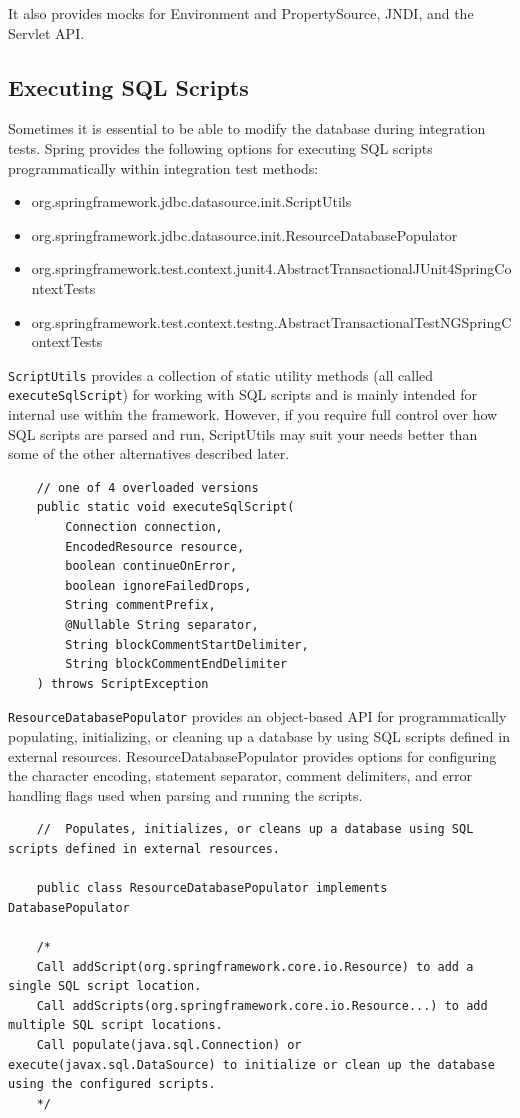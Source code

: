 \documentclass{scrartcl}
\begin{document}
It also provides mocks for Environment and PropertySource, JNDI, and the Servlet API.
\subsection{Executing SQL Scripts}

Sometimes it is essential to be able to modify the database during integration tests.
Spring provides the following options for executing SQL scripts programmatically within integration test methods:

\begin{itemize}
    \item org.springframework.jdbc.datasource.init.ScriptUtils
    \item org.springframework.jdbc.datasource.init.ResourceDatabasePopulator
    \item org.springframework.test.context.junit4.AbstractTransactionalJUnit4SpringContextTests
    \item org.springframework.test.context.testng.AbstractTransactionalTestNGSpringContextTests
\end{itemize}

\lstinline|ScriptUtils| provides a collection of static utility methods (all called \lstinline|executeSqlScript|) for working with SQL scripts and is mainly intended for internal use within the framework. However, if you require full control over how SQL scripts are parsed and run, ScriptUtils may suit your needs better than some of the other alternatives described later.

\begin{lstlisting}
    // one of 4 overloaded versions
    public static void executeSqlScript(
        Connection connection,
        EncodedResource resource,
        boolean continueOnError,
        boolean ignoreFailedDrops,
        String commentPrefix,
        @Nullable String separator,
        String blockCommentStartDelimiter,
        String blockCommentEndDelimiter
    ) throws ScriptException
\end{lstlisting}

\lstinline|ResourceDatabasePopulator| provides an object-based API for programmatically populating, initializing, or cleaning up a database by using SQL scripts defined in external resources. ResourceDatabasePopulator provides options for configuring the character encoding, statement separator, comment delimiters, and error handling flags used when parsing and running the scripts.

\begin{lstlisting}
    //  Populates, initializes, or cleans up a database using SQL scripts defined in external resources.

    public class ResourceDatabasePopulator implements DatabasePopulator

    /*
    Call addScript(org.springframework.core.io.Resource) to add a single SQL script location.
    Call addScripts(org.springframework.core.io.Resource...) to add multiple SQL script locations.
    Call populate(java.sql.Connection) or execute(javax.sql.DataSource) to initialize or clean up the database using the configured scripts.
    */

\end{lstlisting}
\end{document}

